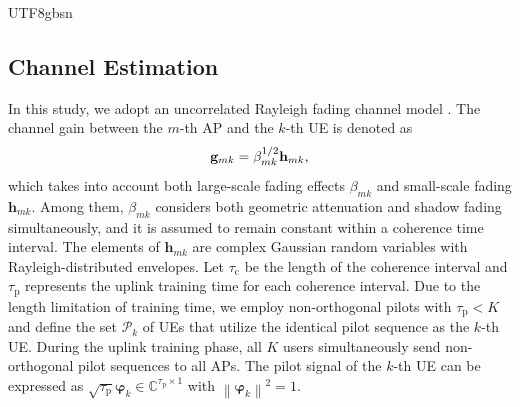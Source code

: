 \documentclass[lettersize,journal]{IEEEtran}
\begin{document}
\begin{CJK}{UTF8}{gbsn}
\subsection{Channel Estimation}
In this study, we adopt an uncorrelated Rayleigh fading channel model \cite{paperIA11}. The channel gain between the $m$-th AP and the $k$-th UE is denoted as 
\begin{equation}\mathbf{g} _{mk} = {\beta _{mk}^{1/2} } {{\bf{h}}_{mk}},\end{equation}
which takes into account both large-scale fading effects $\beta  _{mk}$ and small-scale fading $\mathbf{h} _{mk}$. Among them, $\beta_{mk}$ considers both geometric attenuation and shadow fading simultaneously, and it is assumed to remain constant within a coherence time interval. The elements of $\mathbf{h}_{mk}$ are complex Gaussian random variables with Rayleigh-distributed envelopes. Let $\tau_\text{c}$ be the length of the coherence interval and $\tau_\text{p}$ represents the uplink training time for each coherence interval. Due to the length limitation of training time, we employ non-orthogonal pilots with $\tau_\text{p} < K$ and define the set $\mathcal{P}_k$ of UEs that utilize the identical pilot sequence as the $k$-th UE. During the uplink training phase, all $K$ users simultaneously send non-orthogonal pilot sequences to all APs. The pilot signal of the $k$-th UE can be expressed as $\sqrt{\tau_\text{p}}\boldsymbol{\varphi}_k\in \mathbb{C} ^{\tau_\text{p}\times1}$ with $\left\|\boldsymbol{\varphi}_k\right\|^2=1$. 


\end{CJK}
\end{document}
